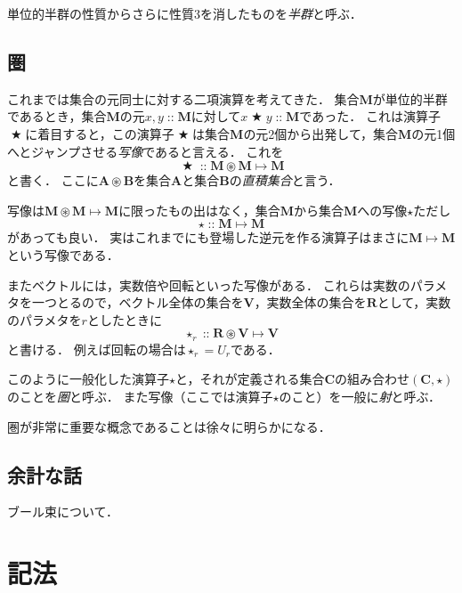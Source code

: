 \documentclass[twocolumn]{jsbook}
\newcommand{\mathAnyBinaryOperator}{\mathop{\bigstar}}
\newcommand{\mathAnyUnaryOperator}{\star}
\newcommand{\mathMapsTo}{\mapsto}
\newcommand{\mathSetTimes}{\circledast}
\newcommand{\mathIn}[1]{\mathop{::}#1}
\newcommand{\mathSet}[1]{\mathbf{#1}}
\newcommand{\mathCategory}[2]{(#1,#2)}
\newcommand{\keyword}[1]{\emph{#1}}
\begin{document}
単位的半群の性質からさらに性質3を消したものを\keyword{半群}と呼ぶ．

\section{圏}

これまでは集合の元同士に対する二項演算を考えてきた．
集合$\mathSet{M}$が単位的半群であるとき，集合$\mathSet{M}$の元$x,y\mathIn\mathSet{M}$に対して$x\mathAnyBinaryOperator y\mathIn\mathSet{M}$であった．
これは演算子$\mathAnyBinaryOperator$に着目すると，この演算子$\mathAnyBinaryOperator$は集合$\mathSet{M}$の元2個から出発して，集合$\mathSet{M}$の元1個へとジャンプさせる\keyword{写像}であると言える．
これを$$\mathAnyBinaryOperator\mathIn\mathSet{M}\mathSetTimes\mathSet{M}\mathMapsTo\mathSet{M}$$と書く．
ここに$\mathSet{A}\mathSetTimes\mathSet{B}$を集合$\mathSet{A}$と集合$\mathSet{B}$の\keyword{直積集合}と言う．

写像は$\mathSet{M}\mathSetTimes\mathSet{M}\mathMapsTo\mathSet{M}$に限ったもの出はなく，集合$\mathSet{M}$から集合$\mathSet{M}$への写像$\mathAnyUnaryOperator$ただし$$\mathAnyUnaryOperator\mathIn\mathSet{M}\mathMapsTo\mathSet{M}$$があっても良い．
実はこれまでにも登場した逆元を作る演算子はまさに$\mathSet{M}\mathMapsTo\mathSet{M}$という写像である．

またベクトルには，実数倍や回転といった写像がある．
これらは実数のパラメタを一つとるので，ベクトル全体の集合を$\mathSet{V}$，実数全体の集合を$\mathSet{R}$として，実数のパラメタを$r$としたときに$$\mathAnyUnaryOperator_r\mathIn\mathSet{R}\mathSetTimes\mathSet{V}\mathMapsTo\mathSet{V}$$と書ける．
例えば回転の場合は$\mathAnyUnaryOperator_r=U_r$である．

このように一般化した演算子$\mathAnyUnaryOperator$と，それが定義される集合$\mathSet{C}$の組み合わせ$\mathCategory{\mathSet{C}}{\mathAnyUnaryOperator}$のことを\keyword{圏}と呼ぶ．
また写像（ここでは演算子$\mathAnyUnaryOperator$のこと）を一般に\keyword{射}と呼ぶ．

圏が非常に重要な概念であることは徐々に明らかになる．

\section*{余計な話}

ブール束について．

\chapter{記法}
\end{document}

